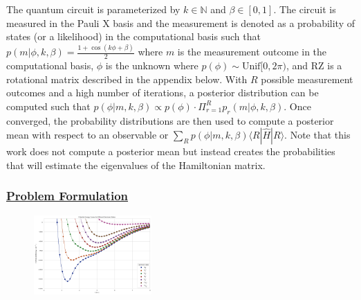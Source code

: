 \documentclass[
]{article}
\begin{document}
The quantum circuit is parameterized by \(k \in \mathbb{N}\) and
\(\beta \in [0 , 1]\). The circuit is measured in the Pauli X basis and
the measurement is denoted as a probability of states (or a likelihood)
in the computational basis such that
\(p(m\vert \phi, k, \beta) = \frac{1 + \cos(k\phi + \beta)}{2}\) where
\(m\) is the measurement outcome in the computational basis, \(\phi\) is
the unknown where \(p(\phi)\sim \text{Unif}[0, 2\pi)\), and RZ is a
rotational matrix described in the appendix below. With \(R\) possible
measurement outcomes and a high number of iterations, a posterior
distribution can be computed such that
\(p(\phi \vert m, k, \beta) \propto p(\phi) \cdot \Pi^R_{r=1}p_{r}(m\vert \phi, k, \beta)\).
Once converged, the probability distributions are then used to compute a
posterior mean with respect to an observable or
\(\sum_R p(\phi \vert m, k, \beta) \langle  R | \hat{H} | R \rangle\).
Note that this work does not compute a posterior mean but instead
creates the probabilities that will estimate the eigenvalues of the
Hamiltonian matrix. \vspace{-0.7cm}

\subsubsection*{\texorpdfstring{\underline{Problem Formulation}}{}}\label{section-2}

\begin{figure}
\includegraphics[width=0.40\textwidth]{tex/potentialenergygraph.png}
\end{figure}
\end{document}
